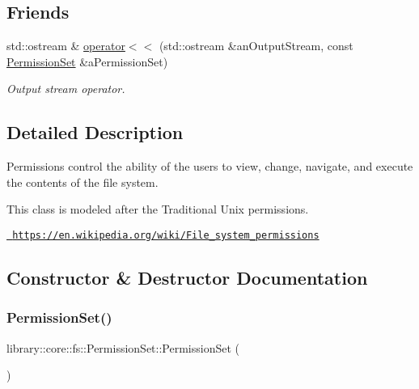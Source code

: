 \subsection*{Friends}
\begin{DoxyCompactItemize}
\item 
std\+::ostream \& \mbox{\hyperlink{classlibrary_1_1core_1_1fs_1_1_permission_set_a8f2d68bb94d86dea76869abe148ea9f3}{operator$<$$<$}} (std\+::ostream \&an\+Output\+Stream, const \mbox{\hyperlink{classlibrary_1_1core_1_1fs_1_1_permission_set}{Permission\+Set}} \&a\+Permission\+Set)
\begin{DoxyCompactList}\small\item\em Output stream operator. \end{DoxyCompactList}\end{DoxyCompactItemize}


\subsection{Detailed Description}
Permissions control the ability of the users to view, change, navigate, and execute the contents of the file system. 

\begin{DoxyVerb}                        This class is modeled after the Traditional Unix permissions.
\end{DoxyVerb}


\href{https://en.wikipedia.org/wiki/File_system_permissions}{\texttt{ https\+://en.\+wikipedia.\+org/wiki/\+File\+\_\+system\+\_\+permissions}} 

\subsection{Constructor \& Destructor Documentation}
\mbox{\label{classlibrary_1_1core_1_1fs_1_1_permission_set_a8a6eb39cc2a8bca92a657d065d3e36ba}} 
\subsubsection{\texorpdfstring{PermissionSet()}{PermissionSet()}\hspace{0.1cm}{\footnotesize\ttfamily [1/2]}}
{\footnotesize\ttfamily library\+::core\+::fs\+::\+Permission\+Set\+::\+Permission\+Set (\begin{DoxyParamCaption}{ }\end{DoxyParamCaption})\hspace{0.3cm}{\ttfamily [delete]}}



